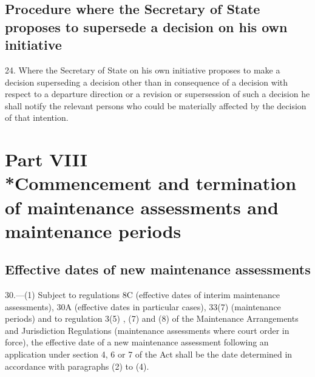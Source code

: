\documentclass[a4paper,12pt]{article}
\begin{document}
\subsection[24. Procedure where the Secretary of State proposes to supersede a decision on his own initiative]{Procedure where the Secretary of State proposes to supersede a decision on his own initiative}

24.  Where the Secretary of State on his own initiative proposes to make a decision superseding a decision other than in consequence of a decision with respect to a departure direction or a revision or supersession of such a decision he shall notify the relevant persons who could be materially affected by the decision of that intention.

\section[Part VIII --- Commencement and termination of maintenance assessments and maintenance periods]{\sloppy Part VIII\\*Commencement and termination of maintenance assessments and maintenance periods}

\renewcommand\parthead{--- Part VIII}

\subsection[30. Effective dates of new maintenance assessments]{Effective dates of new maintenance assessments}

30.—(1) Subject to 
regulations 8C (effective dates of interim maintenance assessments), 30A (effective dates in particular cases), 33(7) (maintenance periods)  %
and to regulation 3(5)%
, (7) and (8)  %
of the Maintenance Arrangements and Jurisdiction Regulations (maintenance assessments where court order in force),  %
 the effective date of a new maintenance assessment following an application under section 4, 6 or 7 of the Act shall be the date determined in accordance with paragraphs (2) to (4).
\end{document}
